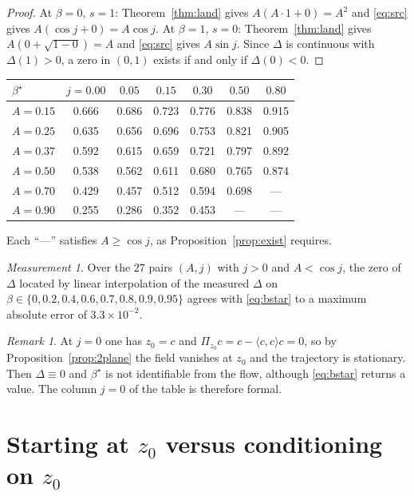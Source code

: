 \documentclass[11pt]{article}
\theoremstyle{definition}
\theoremstyle{remark}
\newtheorem{remark}[lemma]{Remark}
\newtheorem{measurement}[lemma]{Measurement}
\begin{document}
\begin{proof}
At $\beta=0$, $s=1$: Theorem~\ref{thm:land} gives $A(A\cdot1+0)=A^{2}$ and \eqref{eq:src} gives
$A(\cos j+0)=A\cos j$. At $\beta=1$, $s=0$: Theorem~\ref{thm:land} gives $A(0+\sqrt{1-0})=A$ and
\eqref{eq:src} gives $A\sin j$. Since $\Delta$ is continuous with $\Delta(1)>0$, a zero in $(0,1)$
exists if and only if $\Delta(0)<0$.
\end{proof}

\begin{center}
\begin{tabular}{lcccccc}
\toprule
$\beta^{\star}$ & $j=0.00$ & $0.05$ & $0.15$ & $0.30$ & $0.50$ & $0.80$\\
\midrule
$A=0.15$ & 0.666 & 0.686 & 0.723 & 0.776 & 0.838 & 0.915\\
$A=0.25$ & 0.635 & 0.656 & 0.696 & 0.753 & 0.821 & 0.905\\
$A=0.37$ & 0.592 & 0.615 & 0.659 & 0.721 & 0.797 & 0.892\\
$A=0.50$ & 0.538 & 0.562 & 0.611 & 0.680 & 0.765 & 0.874\\
$A=0.70$ & 0.429 & 0.457 & 0.512 & 0.594 & 0.698 & ---\\
$A=0.90$ & 0.255 & 0.286 & 0.352 & 0.453 & --- & ---\\
\bottomrule
\end{tabular}
\end{center}
Each ``---'' satisfies $A\geq\cos j$, as Proposition~\ref{prop:exist} requires.

\begin{measurement}\label{meas:bstar}
Over the $27$ pairs $(A,j)$ with $j>0$ and $A<\cos j$, the zero of $\Delta$ located by linear
interpolation of the measured $\Delta$ on $\beta\in\{0,0.2,0.4,0.6,0.7,0.8,0.9,0.95\}$ agrees with
\eqref{eq:bstar} to a maximum absolute error of $3.3\times10^{-2}$.
\end{measurement}

\begin{remark}\label{rem:jzero}
At $j=0$ one has $z_0=c$ and $\Pi_{z_0}c=c-\langle c,c\rangle c=0$, so by
Proposition~\ref{prop:2plane} the field vanishes at $z_0$ and the trajectory is stationary. Then
$\Delta\equiv0$ and $\beta^{\star}$ is not identifiable from the flow, although \eqref{eq:bstar}
returns a value. The column $j=0$ of the table is therefore formal.
\end{remark}

\section{Starting at $z_0$ versus conditioning on $z_0$}\label{sec:cond}
\end{document}
